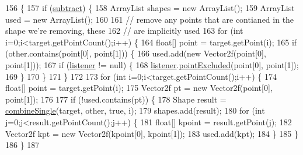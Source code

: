 \begin{DoxyCode}
156                                                                          \{
157         \textcolor{keywordflow}{if} (\mbox{\hyperlink{classorg_1_1newdawn_1_1slick_1_1geom_1_1_geom_util_a4c08d4344876c0f7225933783a26a56a}{subtract}}) \{
158             ArrayList shapes = \textcolor{keyword}{new} ArrayList();
159             ArrayList used = \textcolor{keyword}{new} ArrayList();
160             
161             \textcolor{comment}{// remove any points that are contianed in the shape we're removing, these}
162             \textcolor{comment}{// are implicitly used}
163             \textcolor{keywordflow}{for} (\textcolor{keywordtype}{int} i=0;i<target.getPointCount();i++) \{
164                 \textcolor{keywordtype}{float}[] point = target.getPoint(i);
165                 \textcolor{keywordflow}{if} (other.contains(point[0], point[1])) \{
166                     used.add(\textcolor{keyword}{new} Vector2f(point[0], point[1]));
167                     \textcolor{keywordflow}{if} (\mbox{\hyperlink{classorg_1_1newdawn_1_1slick_1_1geom_1_1_geom_util_a322b4fbea4e3b04b040c81c1322809bb}{listener}} != null) \{
168                         \mbox{\hyperlink{classorg_1_1newdawn_1_1slick_1_1geom_1_1_geom_util_a322b4fbea4e3b04b040c81c1322809bb}{listener}}.\mbox{\hyperlink{interfaceorg_1_1newdawn_1_1slick_1_1geom_1_1_geom_util_listener_ab800520173f64c032206777411644b4c}{pointExcluded}}(point[0], point[1]);
169                     \}
170                 \}
171             \}
172 
173             \textcolor{keywordflow}{for} (\textcolor{keywordtype}{int} i=0;i<target.getPointCount();i++) \{
174                 \textcolor{keywordtype}{float}[] point = target.getPoint(i);
175                 Vector2f pt = \textcolor{keyword}{new} Vector2f(point[0], point[1]);
176                 
177                 \textcolor{keywordflow}{if} (!used.contains(pt)) \{
178                     Shape result = \mbox{\hyperlink{classorg_1_1newdawn_1_1slick_1_1geom_1_1_geom_util_a3aea00a7563f7885b2eadff26ec37014}{combineSingle}}(target, other, \textcolor{keyword}{true}, i);
179                     shapes.add(result);
180                     \textcolor{keywordflow}{for} (\textcolor{keywordtype}{int} j=0;j<result.getPointCount();j++) \{
181                         \textcolor{keywordtype}{float}[] kpoint = result.getPoint(j);
182                         Vector2f kpt = \textcolor{keyword}{new} Vector2f(kpoint[0], kpoint[1]);
183                         used.add(kpt);
184                     \}
185                 \}
186             \}
187             

\end{DoxyCode}
